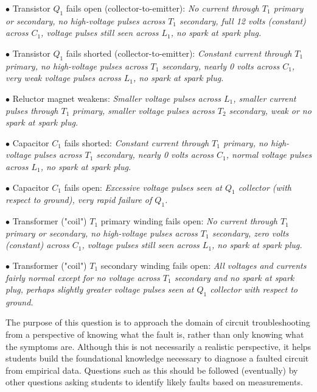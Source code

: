 \medskip
\item{$\bullet$} Transistor $Q_1$ fails open (collector-to-emitter): {\it No current through $T_1$ primary or secondary, no high-voltage pulses across $T_1$ secondary, full 12 volts (constant) across $C_1$, voltage pulses still seen across $L_1$, no spark at spark plug.}
\vskip 5pt
\item{$\bullet$} Transistor $Q_1$ fails shorted (collector-to-emitter): {\it Constant current through $T_1$ primary, no high-voltage pulses across $T_1$ secondary, nearly 0 volts across $C_1$, very weak voltage pulses across $L_1$, no spark at spark plug.}
\vskip 5pt
\item{$\bullet$} Reluctor magnet weakens: {\it Smaller voltage pulses across $L_1$, smaller current pulses through $T_1$ primary, smaller voltage pulses across $T_2$ secondary, weak or no spark at spark plug.}
\vskip 5pt
\item{$\bullet$} Capacitor $C_1$ fails shorted: {\it Constant current through $T_1$ primary, no high-voltage pulses across $T_1$ secondary, nearly 0 volts across $C_1$, normal voltage pulses across $L_1$, no spark at spark plug.}
\vskip 5pt
\item{$\bullet$} Capacitor $C_1$ fails open: {\it Excessive voltage pulses seen at $Q_1$ collector (with respect to ground), very rapid failure of $Q_1$.}
\vskip 5pt
\item{$\bullet$} Transformer ("coil") $T_1$ primary winding fails open: {\it No current through $T_1$ primary or secondary, no high-voltage pulses across $T_1$ secondary, zero volts (constant) across $C_1$, voltage pulses still seen across $L_1$, no spark at spark plug.}
\vskip 5pt
\item{$\bullet$} Transformer ("coil") $T_1$ secondary winding fails open: {\it All voltages and currents fairly normal except for no voltage across $T_1$ secondary and no spark at spark plug, perhaps slightly greater voltage pulses seen at $Q_1$ collector with respect to ground.}
\medskip







The purpose of this question is to approach the domain of circuit troubleshooting from a perspective of knowing what the fault is, rather than only knowing what the symptoms are.  Although this is not necessarily a realistic perspective, it helps students build the foundational knowledge necessary to diagnose a faulted circuit from empirical data.  Questions such as this should be followed (eventually) by other questions asking students to identify likely faults based on measurements.




